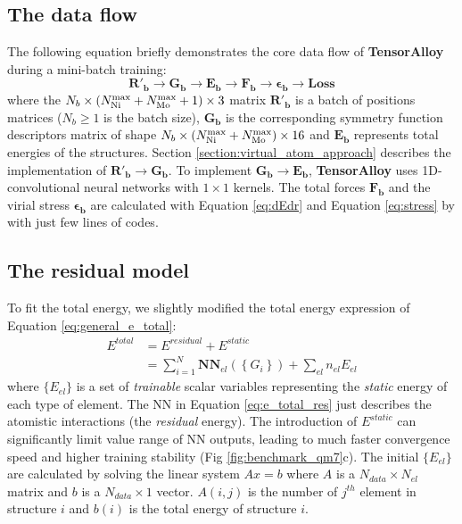 \documentclass[prb,preprint]{revtex4-2}
\begin{document}
\subsection{The data flow}

The following equation briefly demonstrates the core data flow of 
\textbf{TensorAlloy} during a mini-batch training: 
\begin{equation}
    \mathbf{R'_{b}} \rightarrow 
    \mathbf{G_b} \rightarrow 
    \mathbf{E_b} \rightarrow
    \mathbf{F_b} \rightarrow 
    \mathbf{\epsilon_b} \rightarrow
    \mathbf{Loss}
\end{equation}
where the $N_{b} \times (N_{\mathrm{Ni}}^{\mathrm{max}}+N_{\mathrm{Mo}}^{\mathrm{max}} + 1) \times 3$ matrix $\mathbf{R'_b}$ is a batch 
of positions matrices ($N_b \ge 1$ is the batch size), $\mathbf{G_b}$ is the 
corresponding symmetry function descriptors matrix of shape 
$N_{b} \times (N_{\mathrm{Ni}}^{\mathrm{max}}+N_{\mathrm{Mo}}^{\mathrm{max}}) \times 16$ and $\mathbf{E_b}$ represents 
total energies of the structures. Section \ref{section:virtual_atom_approach} 
describes the implementation of $\mathbf{R'_{b}} \rightarrow \mathbf{G_b}$. 
To implement $\mathbf{G_b} \rightarrow \mathbf{E_b}$, \textbf{TensorAlloy} uses 
1D-convolutional neural networks with $1 \times 1$ kernels\cite{kCON}. The total 
forces $\mathbf{F_{b}}$ and the virial stress $\mathbf{\epsilon_{b}}$ are 
calculated with Equation \ref{eq:dEdr} and Equation \ref{eq:stress} by with just 
few lines of codes.

\subsection{The residual model}

To fit the total energy, we slightly modified the total energy expression of 
Equation \ref{eq:general_e_total}:
\begin{align}
\label{eq:e_total_res}
E^{total} & = E^{residual} + E^{static} \nonumber \\
& = \sum_{i=1}^{N}{
    \mathbf{NN}_{el}\left( \left\{ G_i \right\} \right)
} + \sum_{el}{n_{el}E_{el}}
\end{align}
where $\{E_{el}\}$ is a set of \textit{trainable} scalar variables representing 
the \textit{static} energy of each type of element\cite{kCON}. The NN in 
Equation \ref{eq:e_total_res} just describes the atomistic interactions 
(the \textit{residual} energy). The 
introduction of $E^{static}$ can significantly limit value range of NN outputs, 
leading to much faster convergence speed and higher training stability 
(Fig \ref{fig:benchmark_qm7}c). The initial $\{E_{el}\}$ are calculated by 
solving the linear system $Ax=b$ where $A$ is a $N_{data} \times N_{el}$ matrix 
and $b$ is a $N_{data}\times 1$ vector. $A(i,j)$ is the number of $j^{th}$
element in structure $i$ and $b(i)$ is the total energy of structure $i$.
\end{document}
